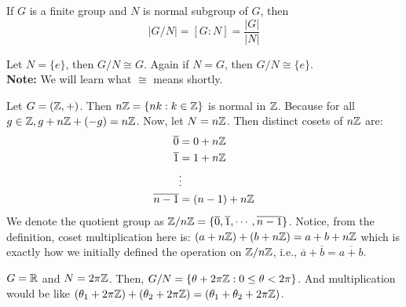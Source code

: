 If $G$ is a finite group and $N$ is normal subgroup of $G$, then $$|G/N| = [G:N] = \frac{|G|}{|N|}$$
\begin{eg}
    Let $N = \{e\}$, then $G/N \cong G$.
    Again if $N = G$, then $G/N \cong \{e\}$.\\
    \textbf{Note:} We will learn what $\cong$ means shortly.
\end{eg}
\begin{eg}
 Let $G = (\mathbb{Z}, +)$. Then $n\mathbb{Z} = \{nk: k \in \mathbb{Z}\}$ is normal in $\mathbb{Z}$. Because for all $g \in \mathbb{Z}, g + n\mathbb{Z} + (-g) = n\mathbb{Z}$. Now, let $N = n\mathbb{Z}$. Then distinct cosets of $n\mathbb{Z}$ are:
 \begin{align*}
    \overline{0} &= 0 + n\mathbb{Z}\\
    \overline{1} &= 1 + n\mathbb{Z}\\
    &\vdots\\
    \overline{n-1} &= (n-1) + n\mathbb{Z}
 \end{align*}
 We denote the quotient group as $\mathbb{Z}/n\mathbb{Z} = \{\overline{0}, \overline{1}, \cdots, \overline{n-1}\}$. Notice, from the definition, coset multiplication here is: $(a + n\mathbb{Z}) + (b + n\mathbb{Z}) = a + b + n\mathbb{Z}$ which is exactly how we initially defined the operation on $\mathbb{Z}/n\mathbb{Z}$, i.e., $\overline{a} + \overline{b} = \overline{a + b}$.
\end{eg}
\begin{eg}
    $G = \mathbb{R}$ and $N = 2\pi \mathbb{Z}$. Then, $G/N = \{\theta +2\pi \mathbb{Z}: 0 \le \theta < 2\pi\}$. And multiplication would be like $(\theta_1 + 2\pi\mathbb{Z}) + (\theta_2 + 2\pi\mathbb{Z}) = (\theta_1 + \theta_2 + 2\pi\mathbb{Z})$.
\end{eg}
